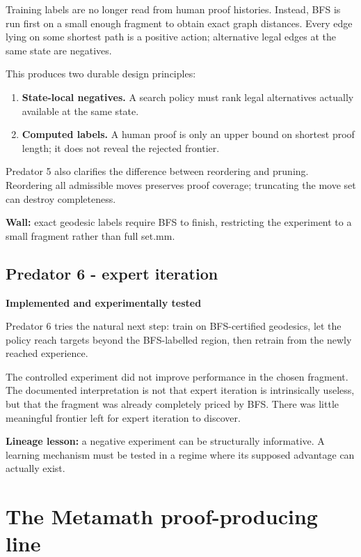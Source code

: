 \documentclass[11pt]{article}
\newcommand{\tested}{\textbf{Implemented and experimentally tested}}
\begin{document}
Training labels are no longer read from human proof histories. Instead, BFS is run first on a small enough fragment to obtain exact graph distances. Every edge lying on some shortest path is a positive action; alternative legal edges at the same state are negatives.

This produces two durable design principles:
\begin{enumerate}
\item \textbf{State-local negatives.} A search policy must rank legal alternatives actually available at the same state.
\item \textbf{Computed labels.} A human proof is only an upper bound on shortest proof length; it does not reveal the rejected frontier.
\end{enumerate}

Predator 5 also clarifies the difference between reordering and pruning. Reordering all admissible moves preserves proof coverage; truncating the move set can destroy completeness.

\textbf{Wall:} exact geodesic labels require BFS to finish, restricting the experiment to a small fragment rather than full set.mm.

\subsection{Predator 6 - expert iteration}

\begin{statusbox}\tested\end{statusbox}

Predator 6 tries the natural next step: train on BFS-certified geodesics, let the policy reach targets beyond the BFS-labelled region, then retrain from the newly reached experience.

The controlled experiment did not improve performance in the chosen fragment. The documented interpretation is not that expert iteration is intrinsically useless, but that the fragment was already completely priced by BFS. There was little meaningful frontier left for expert iteration to discover.

\textbf{Lineage lesson:} a negative experiment can be structurally informative. A learning mechanism must be tested in a regime where its supposed advantage can actually exist.

\section{The Metamath proof-producing line}
\end{document}
